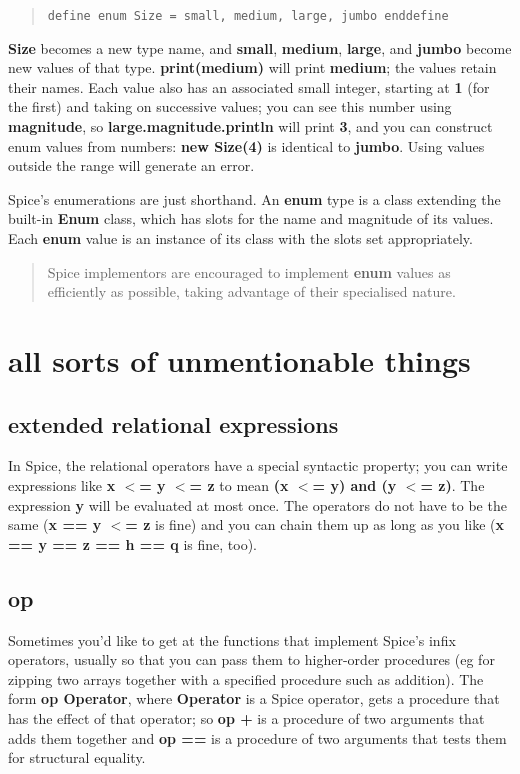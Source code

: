 \documentclass{report}
\begin{document}
\begin{quote}
\begin{verbatim}
define enum Size = small, medium, large, jumbo enddefine
\end{verbatim}
\end{quote}
{\bf Size} becomes a new type name, and {\bf small}, {\bf medium}, {\bf large}, and {\bf jumbo}
become new values of that type. {\bf print(medium)} will print {\bf medium}; the
values retain their names. Each value also has an associated small integer,
starting at {\bf 1} (for the first) and taking on successive values; you can see
this number using {\bf magnitude}, so {\bf large.magnitude.println} will print {\bf 3},
and you can construct enum values from numbers: {\bf new Size(4)} is identical to
{\bf jumbo}. Using values outside the range will generate an error.

Spice's enumerations are just shorthand. An {\bf enum} type is a class
extending the built-in {\bf Enum} class, which has slots for the name and
magnitude of its values. Each {\bf enum} value is an instance of its class
with the slots set appropriately.

\begin{quote}Spice implementors are encouraged to implement {\bf enum} values as efficiently as
possible, taking advantage of their specialised nature.
\end{quote}\chapter{all sorts of unmentionable things}


\section{extended relational expressions}


In Spice, the relational operators have a special syntactic property;
you can write expressions like {\bf x $<$= y $<$= z} to mean {\bf (x $<$= y) and (y $<$= z)}.
The expression {\bf y} will be evaluated at most once. The operators do not have
to be the same ({\bf x == y $<$= z} is fine) and you can chain them up as long as
you like ({\bf x == y == z == h == q} is fine, too).\section{op}


Sometimes you'd like to get at the functions that implement Spice's infix
operators, usually so that you can pass them to higher-order procedures
(eg for zipping two arrays together with a specified procedure such as
addition). The form {\bf op Operator}, where {\bf Operator} is a Spice operator,
gets a procedure that has the effect of that operator; so {\bf op +} is a
procedure of two arguments that adds them together and {\bf op ==} is a
procedure of two arguments that tests them for structural equality.
\end{document}
